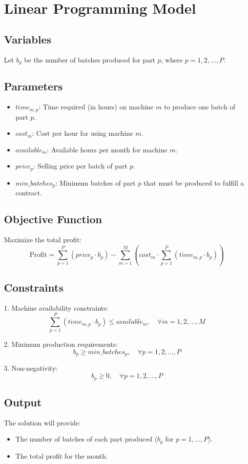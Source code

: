 \documentclass{article}
\begin{document}
\section*{Linear Programming Model}

\subsection*{Variables}
Let \( b_p \) be the number of batches produced for part \( p \), where \( p = 1, 2, \ldots, P \).

\subsection*{Parameters}
\begin{itemize}
    \item \( time_{m,p} \): Time required (in hours) on machine \( m \) to produce one batch of part \( p \).
    \item \( cost_{m} \): Cost per hour for using machine \( m \).
    \item \( available_{m} \): Available hours per month for machine \( m \).
    \item \( price_{p} \): Selling price per batch of part \( p \).
    \item \( min\_batches_{p} \): Minimum batches of part \( p \) that must be produced to fulfill a contract.
\end{itemize}

\subsection*{Objective Function}
Maximize the total profit:
\[
\text{Profit} = \sum_{p=1}^{P} (price_{p} \cdot b_p) - \sum_{m=1}^{M} \left( cost_{m} \cdot \sum_{p=1}^{P} (time_{m,p} \cdot b_p) \right)
\]

\subsection*{Constraints}
1. Machine availability constraints:
\[
\sum_{p=1}^{P} (time_{m,p} \cdot b_p) \leq available_{m}, \quad \forall m = 1, 2, \ldots, M
\]

2. Minimum production requirements:
\[
b_p \geq min\_batches_{p}, \quad \forall p = 1, 2, \ldots, P
\]

3. Non-negativity:
\[
b_p \geq 0, \quad \forall p = 1, 2, \ldots, P
\]

\subsection*{Output}
The solution will provide:
\begin{itemize}
    \item The number of batches of each part produced (\( b_p \) for \( p = 1, \ldots, P \)).
    \item The total profit for the month.
\end{itemize}
\end{document}
